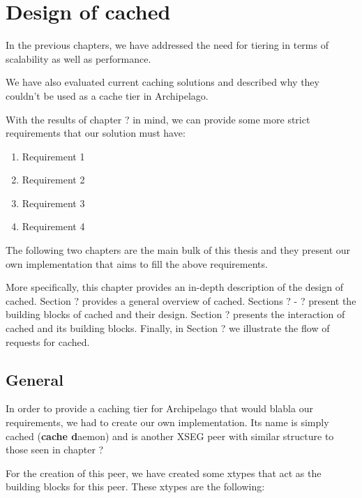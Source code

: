 \chapter{Design of cached}\label{ch:cached-design}

In the previous chapters, we have addressed the need for tiering in terms of
scalability as well as performance. %

We have also evaluated current caching solutions and described why they couldn't 
be used as a cache tier in Archipelago. %

With the results of chapter ? in mind, we can provide some more strict 
requirements that our solution must have:

\begin{enumerate}
	\item Requirement 1
	\item Requirement 2
	\item Requirement 3
	\item Requirement 4
\end{enumerate}

The following two chapters are the main bulk of this thesis and they present our 
own implementation that aims to fill the above requirements.

More specifically, this chapter provides an in-depth description of the design 
of cached.  Section ?  provides a general overview of cached. Sections ? - ?  
present the building blocks of cached and their design. Section ? presents the 
interaction of cached and its building blocks. Finally, in Section ? we 
illustrate the flow of requests for cached.

\section{General}

In order to provide a caching tier for Archipelago that would blabla our 
requirements, we had to create our own implementation. Its name is simply cached 
(\textbf{cache d}aemon) and is another XSEG peer with similar structure to those 
seen in chapter ? %

For the creation of this peer, we have created some xtypes
that act as the building blocks for this peer. These xtypes are the following:

